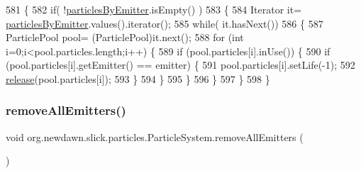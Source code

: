 \begin{DoxyCode}
581                                                     \{
582         \textcolor{keywordflow}{if}( !\mbox{\hyperlink{classorg_1_1newdawn_1_1slick_1_1particles_1_1_particle_system_aec10bb63c0065ee17c8d8133936f5db6}{particlesByEmitter}}.isEmpty() )
583         \{
584             Iterator it= \mbox{\hyperlink{classorg_1_1newdawn_1_1slick_1_1particles_1_1_particle_system_aec10bb63c0065ee17c8d8133936f5db6}{particlesByEmitter}}.values().iterator();
585             \textcolor{keywordflow}{while}( it.hasNext())
586             \{
587                 ParticlePool pool= (ParticlePool)it.next();
588                 \textcolor{keywordflow}{for} (\textcolor{keywordtype}{int} i=0;i<pool.particles.length;i++) \{
589                     \textcolor{keywordflow}{if} (pool.particles[i].inUse()) \{
590                         \textcolor{keywordflow}{if} (pool.particles[i].getEmitter() == emitter) \{
591                             pool.particles[i].setLife(-1);
592                             \mbox{\hyperlink{classorg_1_1newdawn_1_1slick_1_1particles_1_1_particle_system_a942eda71ebce01671173f8e203327c0c}{release}}(pool.particles[i]);
593                         \}
594                     \}
595                 \}
596             \}
597         \}
598     \}
\end{DoxyCode}
\mbox{\label{classorg_1_1newdawn_1_1slick_1_1particles_1_1_particle_system_a796dd48f87a0505b2db585fdbff38305}} 
\subsubsection{\texorpdfstring{remove\+All\+Emitters()}{removeAllEmitters()}}
{\footnotesize\ttfamily void org.\+newdawn.\+slick.\+particles.\+Particle\+System.\+remove\+All\+Emitters (\begin{DoxyParamCaption}{ }\end{DoxyParamCaption})\hspace{0.3cm}{\ttfamily [inline]}}

